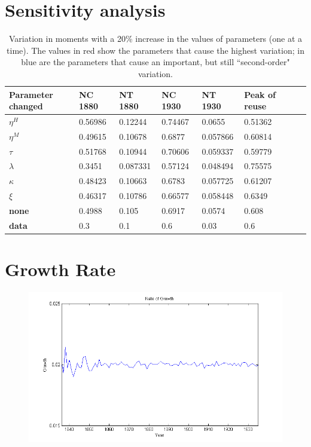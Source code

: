 \documentclass[a4paper,11pt]{article}
\begin{document}
\section{Sensitivity analysis}

\begin{table}[h!]
\begin{tabular}{llllllll}
\hline
\textbf{Parameter changed}&\textbf{NC 1880}&\textbf{NT 1880}&\textbf{NC 1930}&\textbf{NT 1930}&\textbf{Peak of reuse}\\
\hline \hline
\textbf{$\eta^H$}&{\color{red}0.56986}&{\color{red}0.12244}&{\color{red}0.74467}&{\color{red}0.0655}&{\color{red}0.51362}\\
\hline
\textbf{$\eta^M$}&0.49615&0.10678&0.6877&0.057866&0.60814\\
\hline
\textbf{$\tau$}&0.51768&0.10944&0.70606&{\color{blue}0.059337}&0.59779\\
\hline
\textbf{$\lambda$}&{\color{red}0.3451}&{\color{red}0.087331}&{\color{red}0.57124}&{\color{red}0.048494}&{\color{red}0.75575}\\
\hline
\textbf{$\kappa$}&0.48423&0.10663&0.6783&0.057725&0.61207\\
\hline
\textbf{$\xi$}&0.46317&0.10786&{\color{blue}0.66577}&0.058448&{\color{blue}0.6349}\\
\hline
\textbf{none}&0.4988&0.105&0.6917&0.0574&0.608\\
\hline
\textbf{data}&0.3&0.1&0.6&0.03&0.6\\ 
\hline \hline
\end{tabular}
\caption{Variation in moments with a 20\% increase in the values of parameters (one at a time). The values in red show the parameters that cause the highest variation; in blue are the parameters that cause an important, but still ``second-order" variation.}
\end{table}

\section{Growth Rate}

\begin{figure}[h!]
\centering
\includegraphics[scale=.8]{Growth}
\end{figure}
\end{document}
